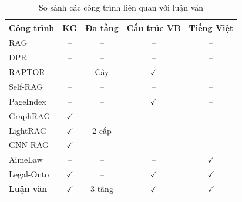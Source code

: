 \begin{table}[htbp]
    \centering
    \caption{So sánh các công trình liên quan với luận văn}
    \label{tab:related-work-compare}
    \small
    \begin{tabular}{p{2.8cm}cccc}
        \toprule
        \textbf{Công trình} & \textbf{KG} & \textbf{Đa tầng} &
        \textbf{Cấu trúc VB} & \textbf{Tiếng Việt} \\
        \midrule
        RAG \cite{lewis2020rag} & -- & -- & -- & -- \\
        DPR \cite{karpukhin2020dpr} & -- & -- & -- & -- \\
        RAPTOR \cite{sarthi2024raptor} & -- & Cây & $\checkmark$ & -- \\
        Self-RAG \cite{asai2024selfrag} & -- & -- & -- & -- \\
        PageIndex \cite{zhang2025pageindex} & -- & -- & $\checkmark$ & -- \\
        GraphRAG \cite{edge2024graphrag} & $\checkmark$ & -- & -- & -- \\
        LightRAG \cite{guo2025lightrag} & $\checkmark$ & 2 cấp & -- & -- \\
        GNN-RAG \cite{mavromatis2024gnnrag} & $\checkmark$ & -- & -- & -- \\
        AimeLaw \cite{ngo2021aimelaw} & -- & -- & -- & $\checkmark$ \\
        Legal-Onto \cite{nguyen2022legalonto} & $\checkmark$ & -- & $\checkmark$ & $\checkmark$ \\
        \textbf{Luận văn} & $\checkmark$ & 3 tầng & $\checkmark$ & $\checkmark$ \\
        \bottomrule
    \end{tabular}
\end{table}
